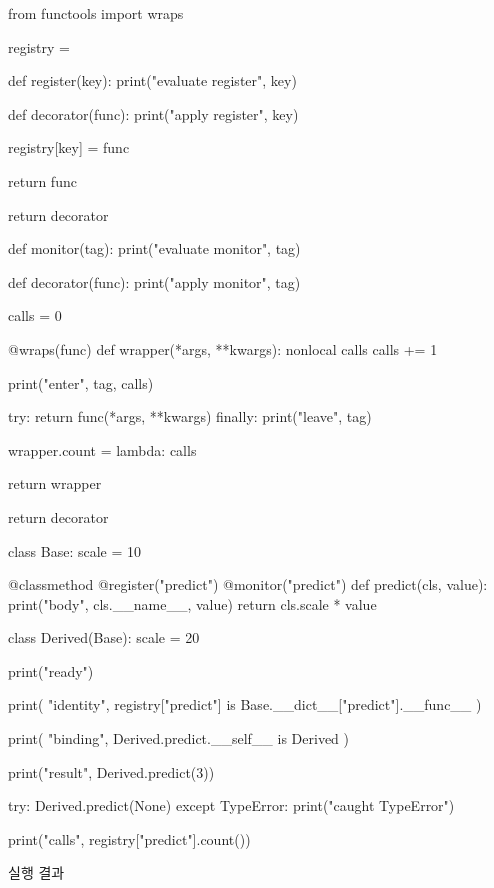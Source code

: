 \begin{dhkcode}
from functools import wraps


registry = {}


def register(key):
    print("evaluate register", key)

    def decorator(func):
        print("apply register", key)

        registry[key] = func

        return func

    return decorator


def monitor(tag):
    print("evaluate monitor", tag)

    def decorator(func):
        print("apply monitor", tag)

        calls = 0

        @wraps(func)
        def wrapper(*args, **kwargs):
            nonlocal calls
            calls += 1

            print("enter", tag, calls)

            try:
                return func(*args, **kwargs)
            finally:
                print("leave", tag)

        wrapper.count = lambda: calls

        return wrapper

    return decorator


class Base:
    scale = 10

    @classmethod
    @register("predict")
    @monitor("predict")
    def predict(cls, value):
        print("body", cls.__name__, value)
        return cls.scale * value


class Derived(Base):
    scale = 20


print("ready")

print(
    "identity",
    registry["predict"]
    is Base.__dict__["predict"].__func__
)

print(
    "binding",
    Derived.predict.__self__ is Derived
)

print("result", Derived.predict(3))

try:
    Derived.predict(None)
except TypeError:
    print("caught TypeError")

print("calls", registry["predict"].count())
\end{dhkcode}

\begin{dhknote}
\begin{dhksmry}[centered]
실행 결과
\end{dhksmry}
\end{dhknote}

